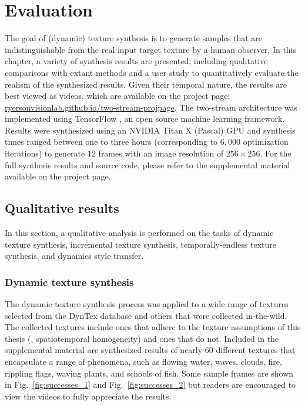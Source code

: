 \chapter{Evaluation}\label{chap:evaluation}

The goal of (dynamic) texture synthesis is to generate 
samples that are indistinguishable from the real input target
texture by a human observer.
In this chapter, a variety of synthesis results are presented,
including qualitative comparisons with extant methods and a user study to quantitatively evaluate the realism
of the synthesized results.
Given their temporal nature, the results are best viewed as 
videos, which are available on the project page: \url{ryersonvisionlab.github.io/two-stream-projpage}.
The two-stream architecture was implemented using TensorFlow
\cite{tabadi2015tensorflow}, an open source machine learning framework.
Results were synthesized using an NVIDIA Titan X (Pascal) GPU
and synthesis times ranged between one to three hours (corresponding to $6,000$ optimization iterations)
to generate $12$ frames with an image resolution of 
$256 \times 256$.
For the full synthesis results and source code, please refer to the
supplemental material available on the project page.

\section{Qualitative results}\label{sec:qualitative_results}

In this section, a qualitative analysis is performed on the tasks of dynamic texture synthesis, incremental texture synthesis,
temporally-endless texture synthesis, and dynamics style transfer.

\subsection{Dynamic texture synthesis}

The dynamic texture synthesis process was applied 
to a wide range of textures selected from the 
DynTex \cite{peteri2010} database and others that were collected in-the-wild.
The collected textures include ones that adhere to the texture assumptions of this thesis (\ie, spatiotemporal homogeneity) and ones that do not.
Included in the supplemental material are synthesized results
of nearly 60 different textures that encapsulate a range of
phenomena, such as flowing water, waves, clouds, fire, rippling
flags, waving plants, and schools of fish.
Some sample frames are shown in Fig.\ \ref{fig:successes_1} and Fig.\ \ref{fig:successes_2}
but readers are encouraged to view the videos to fully appreciate
the results.

